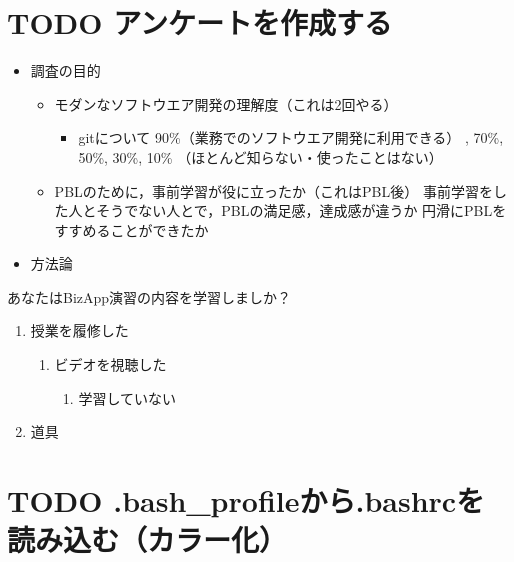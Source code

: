 \documentclass[t, aspectratio=169]{beamer}
\begin{document}
\section{{\bfseries\sffamily TODO} アンケートを作成する}
\label{sec-19-5}
\begin{itemize}
\item 調査の目的
\begin{itemize}
\item モダンなソフトウエア開発の理解度（これは2回やる）
\begin{itemize}
\item gitについて
90\%（業務でのソフトウエア開発に利用できる）
  , 70\%, 50\%, 30\%,
10\% （ほとんど知らない・使ったことはない）
\end{itemize}
\item PBLのために，事前学習が役に立ったか（これはPBL後）
事前学習をした人とそうでない人とで，PBLの満足感，達成感が違うか
円滑にPBLをすすめることができたか
\end{itemize}

\item 方法論
\end{itemize}
あなたはBizApp演習の内容を学習しましか？
\begin{enumerate}
\item 授業を履修した
\begin{enumerate}
\item ビデオを視聴した
\begin{enumerate}
\item 学習していない
\end{enumerate}
\end{enumerate}
\item 道具
\end{enumerate}
\section{{\bfseries\sffamily TODO} .bash\_profileから.bashrcを読み込む（カラー化）}
\label{sec-19-6}
\end{document}

